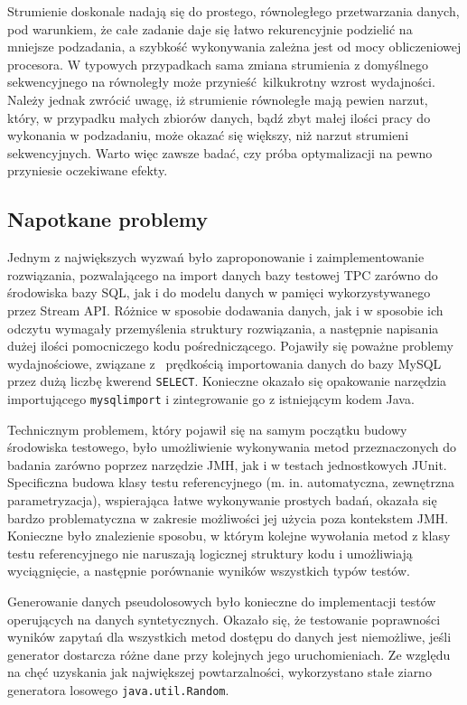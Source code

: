 \documentclass[12pt,twoside,openright]{extarticle}
\begin{document}
    Strumienie doskonale nadają się do prostego, równoległego przetwarzania danych, pod warunkiem, że całe zadanie daje się łatwo rekurencyjnie podzielić na mniejsze podzadania, a szybkość wykonywania zależna jest od mocy obliczeniowej procesora. W typowych przypadkach sama zmiana strumienia z domyślnego sekwencyjnego na równoległy może przynieść kilkukrotny wzrost wydajności. Należy jednak zwrócić uwagę, iż strumienie równoległe mają pewien narzut, który, w przypadku małych zbiorów danych, bądź zbyt małej ilości pracy do wykonania w podzadaniu, może okazać się większy, niż narzut strumieni sekwencyjnych. Warto więc zawsze badać, czy próba optymalizacji na pewno przyniesie oczekiwane efekty.


\subsection{Napotkane problemy}

    Jednym z największych wyzwań było zaproponowanie i zaimplementowanie rozwiązania, pozwalającego na import danych bazy testowej TPC zarówno do środowiska bazy SQL, jak i do modelu danych w pamięci wykorzystywanego przez Stream API. Różnice w sposobie dodawania danych, jak i w sposobie ich odczytu wymagały przemyślenia struktury rozwiązania, a następnie napisania dużej ilości pomocniczego kodu pośredniczącego. Pojawiły się poważne problemy wydajnościowe, związane z~ prędkością importowania danych do bazy MySQL przez dużą liczbę kwerend \texttt{SELECT}. Konieczne okazało się opakowanie narzędzia importującego \texttt{mysqlimport} i zintegrowanie go z istniejącym kodem Java.

    Technicznym problemem, który pojawił się na samym początku budowy środowiska testowego, było umożliwienie wykonywania metod przeznaczonych do badania zarówno poprzez narzędzie JMH, jak i w testach jednostkowych JUnit. Specificzna budowa klasy testu referencyjnego (m. in. automatyczna, zewnętrzna parametryzacja), wspierająca łatwe wykonywanie prostych badań, okazała się bardzo problematyczna w zakresie możliwości jej użycia poza kontekstem JMH. Konieczne było znalezienie sposobu, w którym kolejne wywołania metod z klasy testu referencyjnego nie naruszają logicznej struktury kodu i umożliwiają wyciągnięcie, a następnie porównanie wyników wszystkich typów testów.

    Generowanie danych pseudolosowych było konieczne do implementacji testów operujących na danych syntetycznych. Okazało się, że testowanie poprawności wyników zapytań dla wszystkich metod dostępu do danych jest niemożliwe, jeśli generator dostarcza różne dane przy kolejnych jego uruchomieniach. Ze względu na chęć uzyskania jak największej powtarzalności, wykorzystano stałe ziarno generatora losowego \texttt{java.util.Random}.
\end{document}
